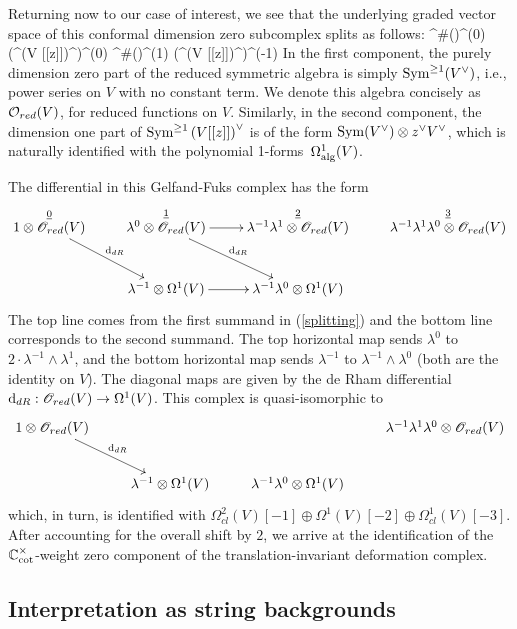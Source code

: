 Returning now to our case of interest, we see that the underlying graded vector space of this conformal dimension zero subcomplex splits as follows:
\be\label{splitting}
\clie^{\#}(\wone)^{(0)} \tensor \left(\Sym^{}\left(V [[z]]\right)^\vee \right)^{(0)} \oplus \clie^{\#}(\wone)^{(1)} \tensor \left(\Sym^{}\left(V [[z]]\right)^\vee\right)^{(-1)}
\ee
In the first component, the purely dimension zero part of the reduced symmetric algebra is simply ${\rm Sym}^{\geq 1}(V^\vee)$, i.e., power series on $V$ with no constant term.
We denote this algebra concisely as $\mathcal O_{red}(V)$, for reduced functions on $V$.
Similarly, in the second component, 
the dimension one part of ${\rm Sym}^{\geq 1}\left(V[[z]]\right)^\vee$ is of the form ${\rm Sym}(V^\vee) \otimes z^\vee V^\vee$, which is naturally identified with the polynomial 1-forms~$\Omega^1_{\rm alg}(V)$. 

The differential in this Gelfand-Fuks complex has the form
\[
\xymatrix{
\overset{\ul{0}}{1 \otimes \sO_{red}(V)} \ar[rd]^{\d_{dR}} & \overset{\ul{1}}{\lambda^0 \otimes \sO_{red}(V)} \ar[r] \ar[rd]^{\d_{dR}} & \overset{\ul{2}}{\lambda^{-1}  \lambda^1 \otimes \sO_{red}(V)} & \overset{\ul{3}}{\lambda^{-1}  \lambda^1  \lambda^0 \otimes \sO_{red}(V)} \\
 & \lambda^{-1} \otimes \Omega^1(V) \ar[r] & \lambda^{-1}  \lambda^0 \otimes\Omega^1(V) &
}
\]
The top line comes from the first summand in (\ref{splitting}) and the bottom line corresponds to the second summand.
The top horizontal map sends $\lambda^0$ to $2 \cdot \lambda^{-1} \wedge \lambda^1$, 
and the bottom horizontal map sends $\lambda^{-1}$ to $\lambda^{-1} \wedge \lambda^0$ (both are the identity on $V$). 
The diagonal maps are given by the de Rham differential ${\rm d}_{dR} : \mathscr O_{red}(V) \to \Omega^1(V)$. 
This complex is quasi-isomorphic to 
\[
\xymatrix{
1 \otimes \sO_{red}(V) \ar[rd]^{\d_{dR}} & & & \lambda^{-1}  \lambda^1  \lambda^0 \otimes \sO_{red}(V) \\
 & \lambda^{-1} \otimes \Omega^1(V) & \lambda^{-1}  \lambda^0 \otimes\Omega^1(V) &
}
\]
which, in turn, is identified with $\Omega^{2}_{cl}(V)[-1] \oplus \Omega^1(V)[-2] \oplus \Omega^1_{cl}(V)[-3]$. 
After accounting for the overall shift by $2$, 
we arrive at the identification of the $\mathbb C_{\rm cot}^\times$-weight zero component of the translation-invariant deformation complex.

\subsection{Interpretation as string backgrounds}

